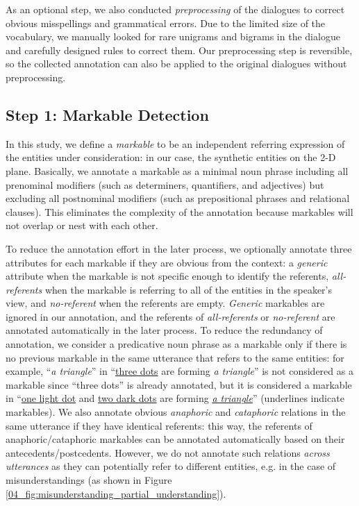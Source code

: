 As an optional step, we also conducted \textit{preprocessing} of the dialogues to correct obvious misspellings and grammatical errors. Due to the limited size of the vocabulary, we manually looked for rare unigrams and bigrams in the dialogue and carefully designed rules to correct them. Our preprocessing step is reversible, so the collected annotation can also be applied to the original dialogues without preprocessing.

\subsection{Step 1: Markable Detection}
\label{04_subsec:markable_detection}

In this study, we define a \textit{markable} to be an independent referring expression of the entities under consideration: in our case, the synthetic entities on the 2-D plane. Basically, we annotate a markable as a minimal noun phrase including all prenominal modifiers (such as determiners, quantifiers, and adjectives) but excluding all postnominal modifiers (such as prepositional phrases and relational clauses). This eliminates the complexity of the annotation because markables will not overlap or nest with each other.

To reduce the annotation effort in the later process, we optionally annotate three attributes for each markable if they are obvious from the context: a \textit{generic} attribute when the markable is not specific enough to identify the referents, \textit{all-referents} when the markable is referring to all of the entities in the speaker's view, and \textit{no-referent} when the referents are empty. \textit{Generic} markables are ignored in our annotation, and the referents of \textit{all-referents} or \textit{no-referent} are annotated automatically in the later process. To reduce the redundancy of annotation, we consider a predicative noun phrase as a markable only if there is no previous markable in the same utterance that refers to the same entities: for example, ``\textit{a triangle}'' in ``\underline{three dots} are forming \textit{a triangle}'' is not considered as a markable since ``three dots'' is already annotated, but it is considered a markable in ``\underline{one light dot} and \underline{two dark dots} are forming \underline{\textit{a triangle}}'' (underlines indicate markables). We also annotate obvious \textit{anaphoric} and \textit{cataphoric} relations in the same utterance if they have identical referents: this way, the referents of anaphoric/cataphoric markables can be annotated automatically based on their antecedents/postcedents. However, we do not annotate such relations \textit{across utterances} as they can potentially refer to different entities, e.g. in the case of misunderstandings (as shown in Figure \ref{04_fig:misunderstanding_partial_understanding}).

